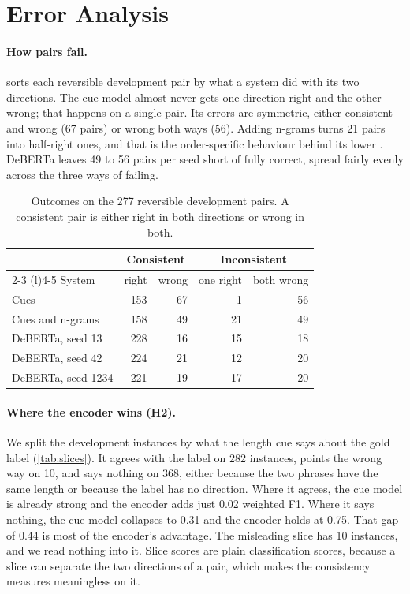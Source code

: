 \section{Error Analysis}
\label{sec:error}

\paragraph{How pairs fail.}
 sorts each reversible development pair by what a system did with its two directions. The cue model almost never gets one direction right and the other wrong; that happens on a single pair. Its errors are symmetric, either consistent and wrong (67 pairs) or wrong both ways (56). Adding n-grams turns 21 pairs into half-right ones, and that is the order-specific behaviour behind its lower \SoftCons{}. DeBERTa leaves 49 to 56 pairs per seed short of fully correct, spread fairly evenly across the three ways of failing.

\begin{table}[t]
\centering
\footnotesize
\setlength{\tabcolsep}{3pt}
\begin{tabular}{@{}lrrrr@{}}
\toprule
 & \multicolumn{2}{c}{Consistent} & \multicolumn{2}{c}{Inconsistent} \\
\cmidrule(lr){2-3} \cmidrule(l){4-5}
System & right & wrong & one right & both wrong \\
\midrule
Cues & 153 & 67 & 1 & 56 \\
Cues and n-grams & 158 & 49 & 21 & 49 \\
DeBERTa, seed 13 & 228 & 16 & 15 & 18 \\
DeBERTa, seed 42 & 224 & 21 & 12 & 20 \\
DeBERTa, seed 1234 & 221 & 19 & 17 & 20 \\
\bottomrule
\end{tabular}
\caption{Outcomes on the 277 reversible development pairs. A consistent pair is either right in both directions or wrong in both.}
\label{tab:pairs}
\end{table}

\paragraph{Where the encoder wins (H2).}
We split the development instances by what the length cue says about the gold label (\cref{tab:slices}). It agrees with the label on 282 instances, points the wrong way on 10, and says nothing on 368, either because the two phrases have the same length or because the label has no direction. Where it agrees, the cue model is already strong and the encoder adds just 0.02 weighted F1. Where it says nothing, the cue model collapses to 0.31 and the encoder holds at 0.75. That gap of 0.44 is most of the encoder's advantage. The misleading slice has 10 instances, and we read nothing into it. Slice scores are plain classification scores, because a slice can separate the two directions of a pair, which makes the consistency measures meaningless on it.

